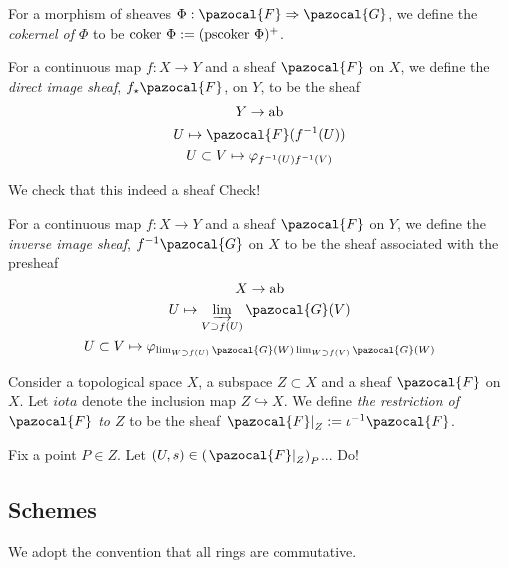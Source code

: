\begin{definition}
    For a morphism of sheaves $\Phi : \pazocal{F}\Rightarrow \pazocal{G}$, we define the \emph{cokernel of $\Phi$} to be $\coker\ \Phi := (\mathrm{pscoker}\ \Phi)^{+}$.
\end{definition}
\begin{definition}
    For a continuous map $f : X\rightarrow Y$ and a sheaf $\pazocal{F}$ on $X$, we define the \emph{direct image sheaf}, $f_\star\pazocal{F}$, on $Y$, to be the sheaf
    \begin{gather*}
        Y \rightarrow \mathrm{ab}\\
        U \mapsto \pazocal{F}(f^{-1}(U))\\
        U\subset V \mapsto \varphi_{f^{-1}(U)f^{-1}(V)}
    \end{gather*}
\end{definition}
\begin{remark}
    We check that this indeed a sheaf {\Large Check!}
\end{remark}
\begin{definition}
    For a continuous map $f : X\rightarrow Y$ and a sheaf $\pazocal{F}$ on $Y$, we define the \emph{inverse image sheaf}, $f^{-1}\pazocal{G}$ on $X$ to be the sheaf associated with the presheaf
    \begin{gather*}
        X\rightarrow \mathrm{ab}\\
        U\mapsto \varinjlim_{V\supset f(U)}\pazocal{G}(V)\\
        U\subset V\mapsto \varphi_{\lim_{W\supset f(U)}\pazocal{G}(W)\lim_{W\supset f(V)}\pazocal{G}(W)}
    \end{gather*}
\end{definition}
\begin{definition}
    Consider a topological space $X$, a subspace $Z\subset X$ and a sheaf $\pazocal{F}$ on $X$. Let $iota$ denote the inclusion map $Z\hookrightarrow X$. We define \emph{the restriction of $\pazocal{F}$ to $Z$} to be the sheaf $\left.\pazocal{F}\right|_{Z}:= \iota^{-1}\pazocal{F}$.
\end{definition}
\begin{remark}
    Fix a point $P\in Z$. Let $(U,s)\in \left(\left. \pazocal{F}\right|_Z\right)_P$... {\Large Do!}
\end{remark}
\subsection{Schemes}
We adopt the convention that all rings are commutative.
